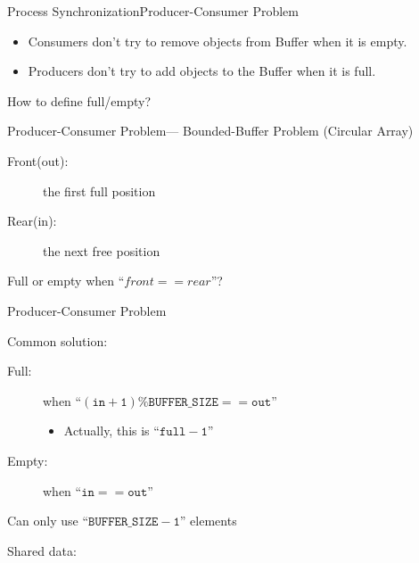 \begin{frame}{Process Synchronization}{Producer-Consumer Problem}
  \begin{itemize}
  \item Consumers don't try to remove objects from Buffer when it is empty.
  \item Producers don't try to add objects to the Buffer when it is full.
  \end{itemize}
  \begin{center}
     
  \end{center}
  \begin{center}
    How to define \alert{full/empty}?
  \end{center}
\end{frame}

\begin{frame}{Producer-Consumer Problem}{--- Bounded-Buffer Problem (Circular Array)}
  \begin{minipage}{.65\linewidth}
  \begin{description}
  \item[Front(out):] the first full position
  \item[Rear(in):] the next free position
  \end{description}
  \end{minipage}\quad
  \begin{minipage}{.3\linewidth}
  \end{minipage}
  Full or empty when ``$front == rear$''?
\end{frame}

\begin{frame}{Producer-Consumer Problem}
  \begin{block}{Common solution:}
    \begin{description}
    \item[Full:] when ``$\mathtt{(in+1)\%BUFFER\_SIZE == out}$''
      \begin{itemize}
      \item[] Actually, this is ``$\mathtt{full - 1}$''
      \end{itemize}
    \item[Empty:] when ``$\mathtt{in == out}$''
    \end{description}
    Can only use ``$\mathtt{BUFFER\_SIZE-1}$'' elements
  \end{block}
  
  \begin{block}{Shared data:}
    \begin{center}
    \end{center}
  \end{block}
\end{frame}


